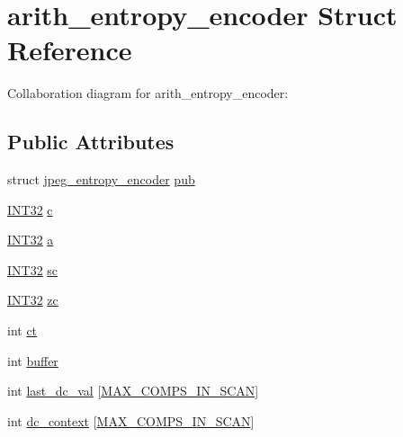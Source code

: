 \hypertarget{structarith__entropy__encoder}{}\section{arith\+\_\+entropy\+\_\+encoder Struct Reference}
\label{structarith__entropy__encoder}


Collaboration diagram for arith\+\_\+entropy\+\_\+encoder\+:
\subsection*{Public Attributes}
\begin{DoxyCompactItemize}
\item 
struct \mbox{\hyperlink{structjpeg__entropy__encoder}{jpeg\+\_\+entropy\+\_\+encoder}} \mbox{\hyperlink{structarith__entropy__encoder_adaa616ab2a0f584358f8233775146d68}{pub}}
\item 
\mbox{\hyperlink{jmorecfg_8h_a0cb58e7e6f0bad369840a52e54a56ae0}{I\+N\+T32}} \mbox{\hyperlink{structarith__entropy__encoder_a84198956e6633b09fda5713b89164292}{c}}
\item 
\mbox{\hyperlink{jmorecfg_8h_a0cb58e7e6f0bad369840a52e54a56ae0}{I\+N\+T32}} \mbox{\hyperlink{structarith__entropy__encoder_afdfd4096eabee6a199afe6764b1ea35a}{a}}
\item 
\mbox{\hyperlink{jmorecfg_8h_a0cb58e7e6f0bad369840a52e54a56ae0}{I\+N\+T32}} \mbox{\hyperlink{structarith__entropy__encoder_aabd22ab89a4d488c9eebb109d91c3655}{sc}}
\item 
\mbox{\hyperlink{jmorecfg_8h_a0cb58e7e6f0bad369840a52e54a56ae0}{I\+N\+T32}} \mbox{\hyperlink{structarith__entropy__encoder_ad02520a5282d4d042bf39e8a50d6ddf8}{zc}}
\item 
int \mbox{\hyperlink{structarith__entropy__encoder_af636dab56c69b209b0bb5aefba723e80}{ct}}
\item 
int \mbox{\hyperlink{structarith__entropy__encoder_a404b730ace823b7212e4953146d02159}{buffer}}
\item 
int \mbox{\hyperlink{structarith__entropy__encoder_a60ba4c07f691b539ba51a25a20dc38ae}{last\+\_\+dc\+\_\+val}} \mbox{[}\mbox{\hyperlink{jpeglib_8h_adc7013da016c19051dc623fb3d8b35b4}{M\+A\+X\+\_\+\+C\+O\+M\+P\+S\+\_\+\+I\+N\+\_\+\+S\+C\+AN}}\mbox{]}
\item 
int \mbox{\hyperlink{structarith__entropy__encoder_a1f8bc39ac0327ddbf46c65434d0ceb75}{dc\+\_\+context}} \mbox{[}\mbox{\hyperlink{jpeglib_8h_adc7013da016c19051dc623fb3d8b35b4}{M\+A\+X\+\_\+\+C\+O\+M\+P\+S\+\_\+\+I\+N\+\_\+\+S\+C\+AN}}\mbox{]}

\end{DoxyCompactItemize}
